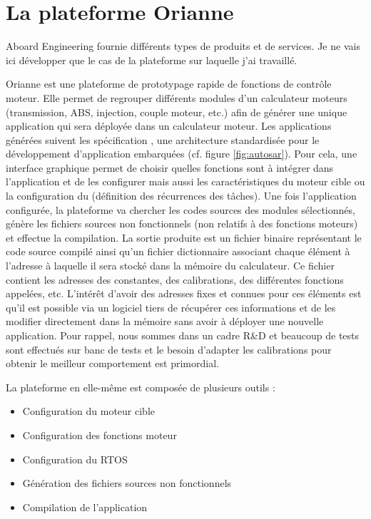 \section{La plateforme Orianne}
\label{sec:orianne}

Aboard Engineering fournie différents types de produits et de services. Je ne vais ici développer que le cas de la plateforme  sur laquelle j'ai travaillé.

Orianne est une plateforme de prototypage rapide de fonctions de contrôle
moteur. Elle permet de regrouper différents modules d'un calculateur moteurs
(transmission, ABS, injection, couple moteur, etc.) afin de générer une unique
application qui sera déployée dans un calculateur moteur. Les applications
générées suivent les spécification , une architecture
standardisée pour le développement d'application embarquées (cf. figure
\ref{fig:autosar}).
Pour cela, une interface graphique permet de choisir quelles fonctions sont à intégrer dans
l'application et de les configurer  mais aussi les caractéristiques du moteur
cible ou la configuration du  (définition des récurrences des
tâches).  Une fois l'application configurée, la plateforme va chercher les codes
sources des modules sélectionnés, génère les fichiers sources non fonctionnels
(non relatifs à des fonctions moteurs) et effectue la compilation.  La sortie
produite est un fichier binaire représentant le code source compilé ainsi qu'un
fichier \og dictionnaire \fg{} associant chaque élément à l'adresse à laquelle
il sera stocké dans la mémoire du calculateur. Ce fichier contient les adresses
des constantes, des calibrations, des différentes fonctions appelées, etc.
L'intérêt d'avoir des adresses fixes et connues pour ces éléments est qu'il est
possible via un logiciel tiers de récupérer ces informations et de les modifier
directement dans la mémoire sans avoir à déployer une nouvelle application. Pour
rappel, nous sommes dans un cadre R\&D et beaucoup de tests sont effectués sur
banc de tests et le besoin d'adapter les calibrations pour obtenir le meilleur
comportement est primordial.

La plateforme en elle-même est composée de plusieurs outils :
\begin{itemize}
	\item Configuration du moteur cible
	\item Configuration des fonctions moteur
	\item Configuration du RTOS
	\item Génération des fichiers sources non fonctionnels
	\item Compilation de l'application
\end{itemize}

